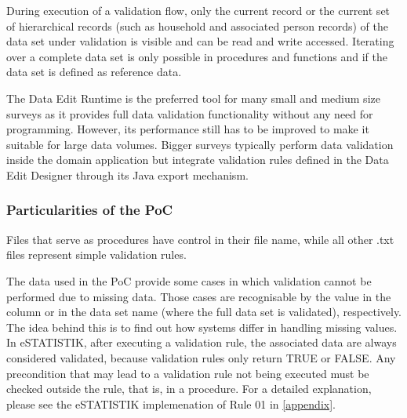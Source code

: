 During execution of a validation flow, only the current record or the current set of hierarchical records (such as household and associated person records) of the data set under validation is visible and can be read and write accessed. Iterating over a complete data set is only possible in procedures and functions and if the data set is defined as reference data.

The Data Edit Runtime is the preferred tool for many small and medium size surveys as it provides full data validation functionality without any need for programming. However, its performance still has to be improved to make it suitable for large data volumes. Bigger surveys typically perform data validation inside the domain application but integrate validation rules defined in the Data Edit Designer through its Java export mechanism.

\subsubsection{Particularities of the PoC}

Files that serve as procedures have control in their file name, while all other .txt files represent simple validation rules.


The data used in the PoC provide some cases in which validation cannot be performed due to missing data. Those cases are recognisable by the value  in the column  or in the data set name (where the full data set is validated), respectively. The idea behind this is to find out how systems differ in handling missing values. In eSTATISTIK, after executing a validation rule, the associated data are always considered validated, because validation rules only return TRUE or FALSE. Any precondition that may lead to a validation rule not being executed must be checked outside the rule, that is, in a procedure. For a detailed explanation, please see the eSTATISTIK implemenation of Rule 01
in \ref{appendix}.
